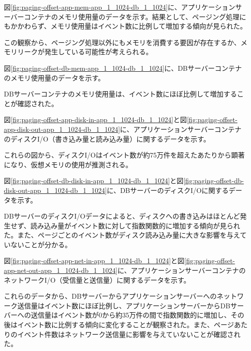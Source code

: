 \documentclass[../../../../main]{subfiles}
\begin{document}
    図\ref{fig:paging-offset-app-mem-app_1_1024-db_1_1024}に、アプリケーションサーバーコンテナのメモリ使用量のデータを示す。結果として、ページング処理にもかかわらず、メモリ使用量はイベント数に比例して増加する傾向が見られた。

    

    この観察から、ページング処理以外にもメモリを消費する要因が存在するか、メモリリークが発生している可能性が考えられる。

    図\ref{fig:paging-offset-db-mem-app_1_1024-db_1_1024}に、DBサーバーコンテナのメモリ使用量のデータを示す。

    

    DBサーバーコンテナのメモリ使用量は、イベント数にほぼ比例して増加することが確認された。

    \label{subsubsubsec:result-paging-offset-only-limit-disk-io}

    図\ref{fig:paging-offset-app-disk-in-app_1_1024-db_1_1024}と図\ref{fig:paging-offset-app-disk-out-app_1_1024-db_1_1024}に、アプリケーションサーバーコンテナのディスクI/O（書き込み量と読み込み量）に関するデータを示す。

    
    

    これらの図から、ディスクI/Oはイベント数が約75万件を超えたあたりから顕著になり、仮想メモリの使用が推測される。

    図\ref{fig:paging-offset-db-disk-in-app_1_1024-db_1_1024}と図\ref{fig:paging-offset-db-disk-out-app_1_1024-db_1_1024}に、DBサーバーのディスクI/Oに関するデータを示す。

    
    

    DBサーバーのディスクI/Oデータによると、ディスクへの書き込みはほとんど発生せず、読み込み量がイベント数に対して指数関数的に増加する傾向が見られた。また、ページごとのイベント数がディスク読み込み量に大きな影響を与えていないことが分かる。

    \label{subsubsubsec:result-paging-offset-only-limit-net-io}

    図\ref{fig:paging-offset-app-net-in-app_1_1024-db_1_1024}と図\ref{fig:paging-offset-app-net-out-app_1_1024-db_1_1024}に、アプリケーションサーバーコンテナのネットワークI/O（受信量と送信量）に関するデータを示す。

    
    

    これらのデータから、DBサーバーからアプリケーションサーバーへのネットワーク送信量はイベント数にほぼ比例し、アプリケーションサーバーからDBサーバーへの送信量はイベント数が0から約35万件の間で指数関数的に増加し、その後はイベント数に比例する傾向に変化することが観察された。また、ページあたりのイベント件数はネットワーク送信量に影響を与えていないことが確認された。
\end{document}
